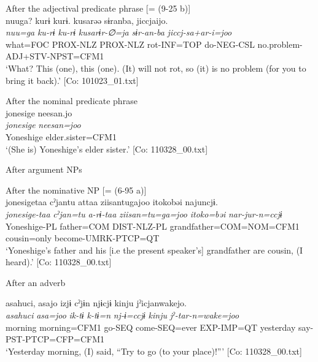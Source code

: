 \begin{xlist}
\begin{xlist}
   \ex  After the adjectival predicate phrase [= (9-25 b)]\\
      \glll    nuuga?  kurɨ  kurɨ.  kusarəə  sɨranba,  jiccjaijo.\\
      \textit{nuu=ga}  \textit{ku-rɨ}  \textit{ku-rɨ}  \textit{kusarɨr-∅=ja}  \textit{sɨr-an-ba}  \textit{jiccj-sa+ar-i=joo}\\
      what=FOC  PROX-NLZ  PROX-NLZ  rot-INF=TOP  do-NEG-CSL  no.problem-ADJ+STV-NPST=CFM1\\
      \glt       ‘What? This (one), this (one). (It) will not rot, so (it) is no problem (for you to bring it back).’ [Co: 101023\_01.txt]

   \ex After the nominal predicate phrase\\
      \glll    jonesige  {\textbar}neesan{\textbar}.jo\\
      \textit{jonesige}  \textit{neesan=joo}\\
      Yoneshige  elder.sister=CFM1\\
      \glt       ‘(She is) Yoneshige’s elder sister.’ [Co: 110328\_00.txt]

  \exi{} After argument NPs

  \ex  After the nominative NP [= (6-95 a)]\\
      \glll    jonesigetaa  cˀjantu  attaa  ziisantugajoo   {\textbar}itoko{\textbar}bəi  najuncjɨ.\\                                                                                             
      \textit{jonesige-taa}  \textit{cˀjan=tu}  \textit{a-rɨ-taa}  \textit{ziisan=tu=ga=joo} \textit{itoko=bəi}  \textit{nar-jur-n=ccjɨ}\\                                                                                             
      Yoneshige-PL  father=COM  DIST-NLZ-PL  grandfather=COM=NOM=CFM1   cousin=only  become-UMRK-PTCP=QT\\
      \glt ‘Yoneshige’s father and his [i.e the present speaker’s] grandfather are cousin, (I heard).’ [Co: 110328\_00.txt]

  \exi{} After an adverb

  \ex  %
      \glll    asahuci,  asajo  izjɨ  cˀjɨn  njɨcjɨ  kinju  jˀicjanwakejo.\\                                                                                              
      \textit{asahuci}  \textit{asa=joo}  \textit{ik-tɨ}  \textit{k-tɨ=n}  \textit{nj-ɨ=ccjɨ} \textit{kinju}  \textit{jˀ-tar-n=wake=joo}\\                                                                                              
      morning  morning=CFM1  go-SEQ  come-SEQ=ever  EXP-IMP=QT   yesterday  say-PST-PTCP=CFP=CFM1\\
      \glt ‘Yesterday morning, (I) said, “Try to go (to your place)!”’      [Co: 110328\_00.txt]
    \end{xlist}
\z


\end{xlist}
